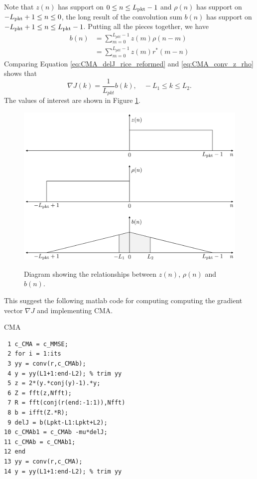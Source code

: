 Note that $z(n)$ has support on $0 \leq n \leq L_\text{pkt}-1$ and 
$\rho(n)$ has support on $-L_\text{pkt}+1 \leq n \leq 0$, 
the long result of the convolution sum $b(n)$ has support on $-L_\text{pkt}+1 \leq n \leq L_\text{pkt}-1$.
Putting all the pieces together, we have
\begin{align}
b(n) &= \sum^{L_{pkt}-1}_{m=0} z(m) \rho(n-m) \nonumber \\
	 &= \sum^{L_{pkt}-1}_{m=0} z(m) r^\ast(m-n)
	 \label{eq:CMA_conv_z_rho}
\end{align}
Comparing Equation \eqref{eq:CMA_delJ_rice_reformed} and \eqref{eq:CMA_conv_z_rho} shows that 
\begin{equation}
\nabla J(k) = \frac{1}{L_{pkt}} b(k), \quad -L_1 \leq k \leq L_2.
\label{eq:CMA_delJ_donzo}
\end{equation}
The values of interest are shown in Figure \ref{fig:convolutionFigureRice}.
\begin{figure}
	\caption{Diagram showing the relationships between $z(n)$, $\rho(n)$ and $b(n)$.}
	\centering\includegraphics[width=10in/100*55]{figures/eq_equations/convolutionFigureRice.pdf}
	\label{fig:convolutionFigureRice}
\end{figure}

This suggest the following matlab code for computing computing the gradient vector $\nabla J$ and implementing CMA.
\begin{table}[h]
\caption{CMA}
\label{code:CMA}
\singlespacing
{\footnotesize
\begin{verbatim}
 1 c_CMA = c_MMSE;
 2 for i = 1:its
 3 yy = conv(r,c_CMAb);
 4 y = yy(L1+1:end-L2); % trim yy
 5 z = 2*(y.*conj(y)-1).*y;
 6 Z = fft(z,Nfft);
 7 R = fft(conj(r(end:-1:1)),Nfft)
 8 b = ifft(Z.*R);
 9 delJ = b(Lpkt-L1:Lpkt+L2);
10 c_CMAb1 = c_CMAb -mu*delJ;
11 c_CMAb = c_CMAb1;
12 end
13 yy = conv(r,c_CMA);
14 y = yy(L1+1:end-L2); % trim yy
\end{verbatim}
}
\end{table}
\doublespacing

